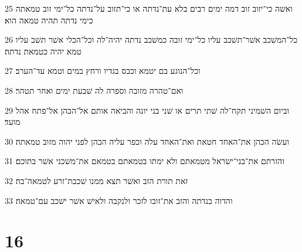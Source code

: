 \par 25 ואשׁה כי־יזוב זוב דמה ימים רבים בלא עת־נדתה או כי־תזוב על־נדתה כל־ימי זוב טמאתה כימי נדתה תהיה טמאה הוא׃
\par 26 כל־המשׁכב אשׁר־תשׁכב עליו כל־ימי זובה כמשׁכב נדתה יהיה־לה וכל־הכלי אשׁר תשׁב עליו טמא יהיה כטמאת נדתה׃
\par 27 וכל־הנוגע בם יטמא וכבס בגדיו ורחץ במים וטמא עד־הערב׃
\par 28 ואם־טהרה מזובה וספרה לה שׁבעת ימים ואחר תטהר׃
\par 29 וביום השׁמיני תקח־לה שׁתי תרים או שׁני בני יונה והביאה אותם אל־הכהן אל־פתח אהל מועד׃
\par 30 ועשׂה הכהן את־האחד חטאת ואת־האחד עלה וכפר עליה הכהן לפני יהוה מזוב טמאתה׃
\par 31 והזרתם את־בני־ישׂראל מטמאתם ולא ימתו בטמאתם בטמאם את־משׁכני אשׁר בתוכם׃
\par 32 זאת תורת הזב ואשׁר תצא ממנו שׁכבת־זרע לטמאה־בה׃
\par 33 והדוה בנדתה והזב את־זובו לזכר ולנקבה ולאישׁ אשׁר ישׁכב עם־טמאה׃

\chapter{16}

